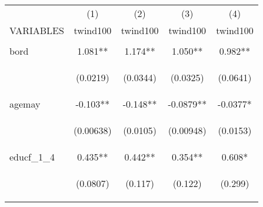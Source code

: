\documentclass[]{article}
\begin{document}
\begin{center}
\begin{tabular}{lcccc} \hline
 & (1) & (2) & (3) & (4) \\
VARIABLES & twind100 & twind100 & twind100 & twind100 \\ \hline
\vspace{4pt} & \begin{footnotesize}\end{footnotesize} & \begin{footnotesize}\end{footnotesize} & \begin{footnotesize}\end{footnotesize} & \begin{footnotesize}\end{footnotesize} \\
bord & 1.081** & 1.174** & 1.050** & 0.982** \\
\vspace{4pt} & \begin{footnotesize}(0.0219)\end{footnotesize} & \begin{footnotesize}(0.0344)\end{footnotesize} & \begin{footnotesize}(0.0325)\end{footnotesize} & \begin{footnotesize}(0.0641)\end{footnotesize} \\
agemay & -0.103** & -0.148** & -0.0879** & -0.0377* \\
\vspace{4pt} & \begin{footnotesize}(0.00638)\end{footnotesize} & \begin{footnotesize}(0.0105)\end{footnotesize} & \begin{footnotesize}(0.00948)\end{footnotesize} & \begin{footnotesize}(0.0153)\end{footnotesize} \\
educf\_1\_4 & 0.435** & 0.442** & 0.354** & 0.608* \\
\vspace{4pt} & \begin{footnotesize}(0.0807)\end{footnotesize} & \begin{footnotesize}(0.117)\end{footnotesize} & \begin{footnotesize}(0.122)\end{footnotesize} & \begin{footnotesize}(0.299)\end{footnotesize} \\

\end{tabular}
\end{center}
\end{document}
